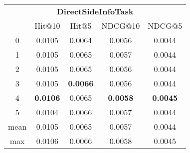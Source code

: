 \documentclass{article}
\begin{document}
 

\begin{tabular}{c|cccc}

\multicolumn{5}{c}{\textbf{DirectSideInfoTask}} \\
\noalign{\smallskip}
\noalign{\smallskip}
\toprule
\multicolumn{1}{c}{Template ID} & \multicolumn{1}{|c}{Hit@10} & \multicolumn{1}{c}{Hit@5} & \multicolumn{1}{c}{NDCG@10} & \multicolumn{1}{c}{NDCG@5} \\
\midrule
0 & 0.0105 & 0.0064 & 0.0056 & 0.0044 \\
1 & 0.0105 & 0.0065 & 0.0057 & 0.0044 \\
2 & 0.0105 & 0.0065 & 0.0056 & 0.0044 \\
3 & 0.0105 & \textbf{0.0066} & 0.0056 & 0.0044 \\
4 & \textbf{0.0106} & 0.0065 & \textbf{0.0058} & \textbf{0.0045} \\
5 & 0.0104 & 0.0066 & 0.0057 & 0.0044 \\
\midrule
mean & 0.0105 & 0.0065 & 0.0057 & 0.0044 \\
max & 0.0106 & 0.0066 & 0.0058 & 0.0045 \\
\bottomrule

\end{tabular}
\end{document}
